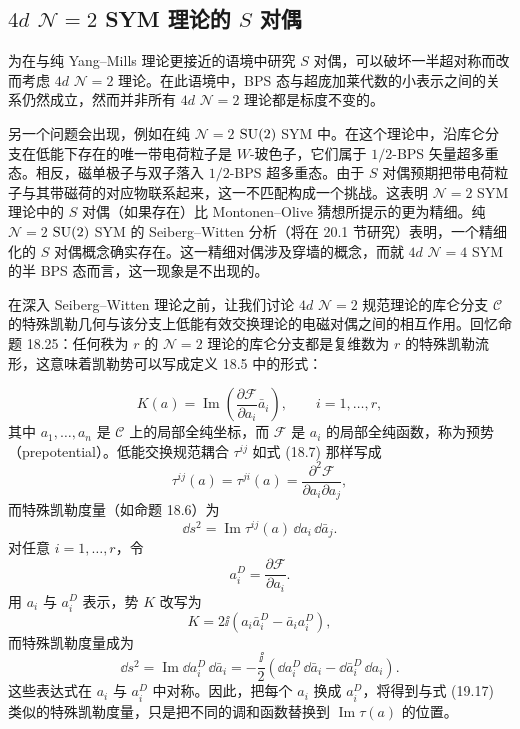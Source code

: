 \subsection{$4d$ $\mathcal{N}=2$ SYM 理论的 $S$ 对偶}

为在与纯 Yang--Mills 理论更接近的语境中研究 $S$ 对偶，可以破坏一半超对称而改而考虑 $4d$ $\mathcal{N}=2$ 理论。在此语境中，BPS 态与超庞加莱代数的小表示之间的关系仍然成立，然而并非所有 $4d$ $\mathcal{N}=2$ 理论都是标度不变的。

另一个问题会出现，例如在纯 $\mathcal{N}=2$ $\operatorname{SU}(2)$ SYM 中。在这个理论中，沿库仑分支在低能下存在的唯一带电荷粒子是 $W$-玻色子，它们属于 $1/2$-BPS 矢量超多重态。相反，磁单极子与双子落入 $1/2$-BPS 超多重态。由于 $S$ 对偶预期把带电荷粒子与其带磁荷的对应物联系起来，这一不匹配构成一个挑战。这表明 $\mathcal{N}=2$ SYM 理论中的 $S$ 对偶（如果存在）比 Montonen--Olive 猜想所提示的更为精细。纯 $\mathcal{N}=2$ $\operatorname{SU}(2)$ SYM 的 Seiberg--Witten 分析（将在 20.1 节研究）表明，一个精细化的 $S$ 对偶概念确实存在。这一精细对偶涉及穿墙的概念，而就 $4d$ $\mathcal{N}=4$ SYM 的半 BPS 态而言，这一现象是不出现的。

在深入 Seiberg--Witten 理论之前，让我们讨论 $4d$ $\mathcal{N}=2$ 规范理论的库仑分支 $\mathcal{C}$ 的特殊凯勒几何与该分支上低能有效交换理论的电磁对偶之间的相互作用。回忆命题 18.25：任何秩为 $r$ 的 $\mathcal{N}=2$ 理论的库仑分支都是复维数为 $r$ 的特殊凯勒流形，这意味着凯勒势可以写成定义 18.5 中的形式：


\[
K(a)=\operatorname{Im}\left(\frac{\partial\mathcal{F}}{\partial a_i}\bar a_i\right),
\qquad i=1,\dots,r,
\]
其中 $a_1,\dots,a_n$ 是 $\mathcal{C}$ 上的局部全纯坐标，而 $\mathcal{F}$ 是 $a_i$ 的局部全纯函数，称为预势（prepotential）。低能交换规范耦合 $\tau^{ij}$ 如式 (18.7) 那样写成
\begin{equation}
\tau^{ij}(a)=\tau^{ji}(a)=\frac{\partial^2\mathcal{F}}{\partial a_i\partial a_j}, \tag{19.16}
\end{equation}
而特殊凯勒度量（如命题 18.6）为
\begin{equation}
\dd s^2=\operatorname{Im}\tau^{ij}(a)\,\dd a_i\,\dd\bar a_j. \tag{19.17}
\end{equation}
对任意 $i=1,\dots,r$，令
\begin{equation}
a^D_i=\frac{\partial\mathcal{F}}{\partial a_i}. \tag{19.18}
\end{equation}
用 $a_i$ 与 $a^D_i$ 表示，势 $K$ 改写为
\[
K=2\ii\left(a_i\bar a^D_i-\bar a_i a^D_i\right),
\]
而特殊凯勒度量成为
\[
\dd s^2=\operatorname{Im}\dd a^D_i\,\dd\bar a_i
=-\frac{\ii}{2}\left(\dd a^D_i\,\dd\bar a_i-\dd\bar a^D_i\,\dd a_i\right).
\]
这些表达式在 $a_i$ 与 $a^D_i$ 中对称。因此，把每个 $a_i$ 换成 $a^D_i$，将得到与式 (19.17) 类似的特殊凯勒度量，只是把不同的调和函数替换到 $\operatorname{Im}\tau(a)$ 的位置。

